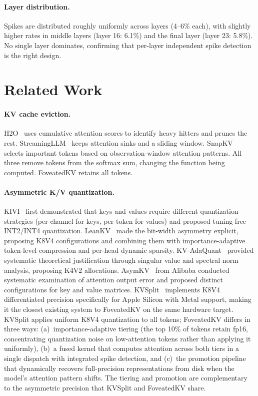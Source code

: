 \documentclass{article}
\begin{document}
\paragraph{Layer distribution.} Spikes are distributed roughly
uniformly across layers (4--6\% each), with slightly higher rates
in middle layers (layer 16: 6.1\%) and the final layer (layer 23:
5.8\%). No single layer dominates, confirming that per-layer
independent spike detection is the right design.

\section{Related Work}

\paragraph{KV cache eviction.}
H2O~\cite{h2o} uses cumulative attention scores to identify heavy
hitters and prunes the rest. StreamingLLM~\cite{streamingllm} keeps
attention sinks and a sliding window. SnapKV~\cite{snapkv} selects
important tokens based on observation-window attention patterns. All
three remove tokens from the softmax sum, changing the function being
computed. FoveatedKV retains all tokens.

\paragraph{Asymmetric K/V quantization.}
KIVI~\cite{kivi} first demonstrated that keys and values require
different quantization strategies (per-channel for keys, per-token for
values) and proposed tuning-free INT2/INT4 quantization.
LeanKV~\cite{leankv} made the bit-width asymmetry explicit, proposing
K8V4 configurations and combining them with importance-adaptive
token-level compression and per-head dynamic sparsity.
KV-AdaQuant~\cite{kvadaquant} provided systematic theoretical
justification through singular value and spectral norm analysis,
proposing K4V2 allocations. AsymKV~\cite{asymkv} from Alibaba
conducted systematic examination of attention output error and proposed
distinct configurations for key and value matrices.
KVSplit~\cite{kvsplit} implements K8V4 differentiated precision
specifically for Apple Silicon with Metal support, making it the closest
existing system to FoveatedKV on the same hardware target. KVSplit
applies uniform K8V4 quantization to all tokens; FoveatedKV differs in
three ways: (a)~importance-adaptive tiering (the top 10\% of tokens
retain fp16, concentrating quantization noise on low-attention tokens
rather than applying it uniformly), (b)~a fused kernel that computes
attention across both tiers in a single dispatch with integrated spike
detection, and (c)~the promotion pipeline that dynamically recovers
full-precision representations from disk when the model's attention
pattern shifts. The tiering and promotion are complementary to the
asymmetric precision that KVSplit and FoveatedKV share.
\end{document}
